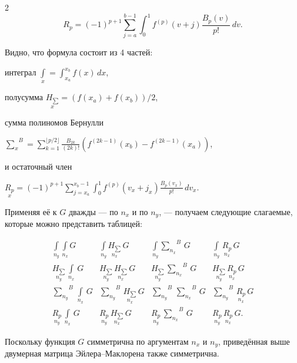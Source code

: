 \documentclass[twoside, 10pt]{article}
\begin{document}
\begin{multicols}{2}
\begin{equation} \label{eq:10}
{\displaystyle R_{p}=(-1)^{p+1}\sum_{j=a}^{b-1} \int _{0}^{1}f^{(p)}(v+j){\frac {B_{p}(v)}{p!}}\,dv}.
\end{equation}

Видно, что формула состоит из 4 частей:

\noindent
интеграл \(\int\limits_{x}^{}=\int _{x_a}^{x_b}f(x)\,dx\),

\noindent
полусумма \(\underset{x}{H_{\sum}}={\left( {f(x_a)+f(x_b)}\right)/{2}}\),

\noindent
сумма полиномов Бернулли

\({\sum\limits_{x}^{}}^{B}=\sum _{k=1}^{\lfloor p/2\rfloor }{\frac {B_{2k}}{(2k)!}}\left(f^{(2k-1)}(x_b)-f^{(2k-1)}(x_a)\right)\),

\noindent
и остаточный член

\(\underset{x}{R_{p}}=(-1)^{p+1}\sum_{j=x_a}^{x_b-1} \int _{0}^{1}f^{(p)}(v_x+j_x){\frac {B_{p}(v_x)}{p!}}\,dv_x\).

Применяя её к \(G\) дважды — по \(n_x\) и по \(n_y\), — получаем следующие слагаемые, которые можно представить таблицей:

    \begin{equation} \label{eq:11}
\begin{array}{cccc}
 \int\limits_{n_y}^{} \int\limits_{n_x}^{} G  &  \int\limits_{n_y}^{} \underset{n_x}{H_{\sum}}\,G  &  \int\limits_{n_y}^{}{\sum\limits_{n_x}^{}}^{B}\,G  &  \int\limits_{n_y}^{}\,\underset{n_x}{R_{p}}\,G  \\
 \underset{n_y}{H_{\sum}}\,\int\limits_{n_x}^{}\,G &  \underset{n_y}{H_{\sum}}\,\underset{n_x}{H_{\sum}}\,G &  \underset{n_y}{H_{\sum}}\,{\sum\limits_{n_x}^{}}^{B}\,G &  \underset{n_y}{H_{\sum}}\,\underset{n_x}{R_{p}}\,G \\
 {\sum\limits_{n_y}^{}}^{B}\,\int\limits_{n_x}^{}\,G  &  {\sum\limits_{n_y}^{}}^{B}\,\underset{n_x}{H_{\sum}}\,G  &  {\sum\limits_{n_y}^{}}^{B}\,{\sum\limits_{n_x}^{}}^{B}\,G  &  {\sum\limits_{n_y}^{}}^{B}\,\underset{n_x}{R_{p}}\,G  \\
 \underset{n_y}{R_{p}}\,\int\limits_{n_x}^{}\,G   &  \underset{n_y}{R_{p}}\,\underset{n_x}{H_{\sum}}\,G   &  \underset{n_y}{R_{p}}\,{\sum\limits_{n_x}^{}}^{B}\,G   &  \underset{n_y}{R_{p}}\,\underset{n_x}{R_{p}}\,G.
\end{array}\end{equation}

    Поскольку функция \(G\) симметрична по аргументам \(n_x\) и \(n_y\), приведённая выше двумерная матрица Эйлера–Маклорена также симметрична.


\end{multicols}
\end{document}
